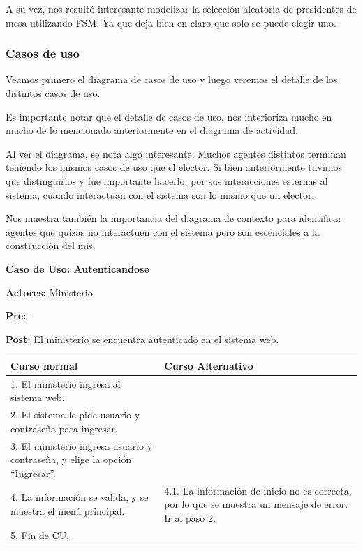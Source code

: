 A su vez, nos resultó interesante modelizar la selección aleatoria de presidentes de mesa utilizando FSM. Ya que deja bien en claro que solo se puede elegir uno.

\subsubsection{Casos de uso}

Veamos primero el diagrama de casos de uso y luego veremos el detalle de los distintos casos de uso.

Es importante notar que el detalle de casos de uso, nos interioriza mucho en mucho de lo mencionado anteriormente en el diagrama de actividad. 


Al ver el diagrama, se nota algo interesante. Muchos agentes distintos terminan teniendo los mismos casos de uso que el elector. Si bien anteriormente tuvimos que distinguirlos y fue importante hacerlo, por sus interacciones esternas al sistema, cuando interactuan con el sistema son lo mismo que un elector.

Nos muestra también la importancia del diagrama de contexto para identificar agentes que quizas no interactuen con el sistema pero son escenciales a la construcción del mis.

\textbf{Caso de Uso: Autenticandose}

\textbf{Actores:} Ministerio

\textbf{Pre:} -

\textbf{Post:} El ministerio se encuentra autenticado en el sistema web.
\begin{table}[h!]
	
 \begin{tabular}{|p{7.5cm} | p{7.5cm}|} 
 \hline
 \textbf{Curso normal} & \textbf{Curso Alternativo} \\
 \hline
 1. El ministerio ingresa al sistema web. & \\
 \hline
 
 2. El sistema le pide usuario y contraseña para ingresar. & \\
 \hline 
 3. El ministerio ingresa usuario y contraseña, y elige la opción “Ingresar”. & \\
 \hline 
 4. La información se valida, y se muestra el menú principal. & 
4.1. La información de inicio no es correcta, por lo que se muestra un mensaje de error. Ir al paso 2.
\\
 \hline 
 5. Fin de CU. & \\

 \hline
 \end{tabular}

\end{table}


